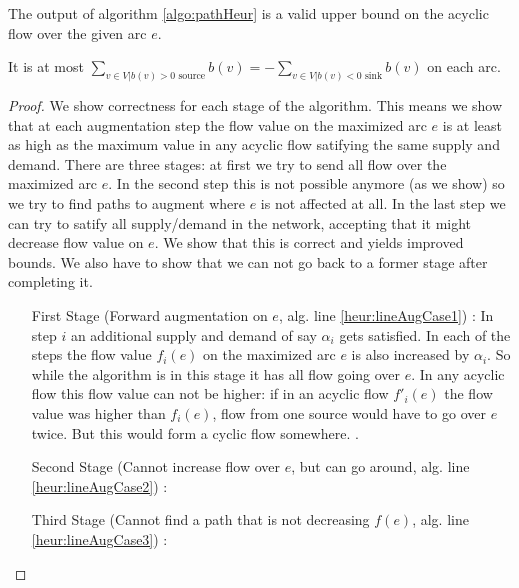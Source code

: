 \begin{prop}
 The output of algorithm \ref{algo:pathHeur} is a valid upper bound on the acyclic flow over the given arc $e$. 
 
 It is at most $\sum_{v\in V|b(v)>0\textrm{ source}}b(v)=-\sum_{v\in V|b(v)<0\textrm{ sink}}b(v)$ on each arc.
\end{prop}
\begin{proof}
 We show correctness for each stage of the algorithm. This means we show that at each augmentation step the flow value 
on the maximized arc $e$ is at least as high as the maximum value in any acyclic flow satifying the same supply and 
demand. There are three stages: at first we try to send all flow over the maximized arc $e$. In the second step this is 
not possible anymore (as we show) so we try to find paths to augment where $e$ is not affected at all. In the last step 
we can try to satify all supply/demand in the network, accepting that it might decrease flow value on $e$. We show that 
this is correct and yields improved bounds. We also have to show that we can not go back to a former stage after 
completing it.
\begin{itemize}
 \item [First Stage (Forward augmentation on $e$, alg. line \ref{heur:lineAugCase1}) :] In step $i$ an additional 
supply and demand of say $\alpha_i$ gets satisfied. In each of the 
steps the flow value $f_i(e)$ on the maximized arc $e$ is also increased by $\alpha_i$. So while the algorithm is in 
this stage it has all flow going over $e$. In any acyclic flow this flow value can not be higher: if in an acyclic flow 
$f'_i(e)$ the flow value was higher than $f_i(e)$, flow from one source would have to go over $e$ twice. But this 
would form a cyclic flow somewhere. \Lightning.

  \item[Second Stage (Cannot increase flow over $e$, but can go around, alg. line \ref{heur:lineAugCase2}) :]
  
  
  \item[Third Stage (Cannot find a path that is not decreasing $f(e)$, alg. line \ref{heur:lineAugCase3}) :] 
\end{itemize}

 
 
 
\end{proof}










